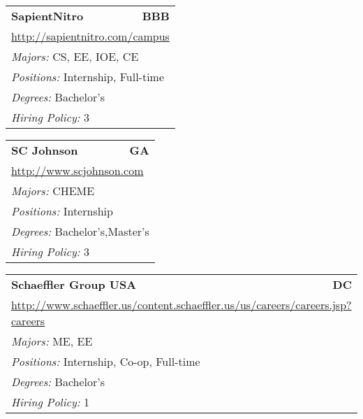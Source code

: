 \documentclass[twoside]{article}
\begin{document}
\begin{center}
\begin{multicols}{3}
\begin{FlushLeft}
\begin{minipage}{.9\columnwidth}
\end{minipage}
 
\begin{minipage}{.9\columnwidth}\begin{tabularx}{.95\columnwidth}{Xr}
                 {\Large\bf SapientNitro} & {\Large\bf BBB}\\
    \multicolumn{2}{p{.95\columnwidth}}{\url{http://sapientnitro.com/campus}}\\
    \multicolumn{2}{p{.95\columnwidth}}{\emph{Majors:} CS, EE, IOE, CE}\\
    \multicolumn{2}{p{.95\columnwidth}}{\emph{Positions:} Internship, Full-time}\\
    \multicolumn{2}{p{.95\columnwidth}}{\emph{Degrees:} Bachelor's}\\
    \multicolumn{2}{p{.95\columnwidth}}{\emph{Hiring Policy:} 3}\\
    \end{tabularx}
    
\end{minipage}
 
\begin{minipage}{.9\columnwidth}\begin{tabularx}{.95\columnwidth}{Xr}
                 {\Large\bf SC Johnson} & {\Large\bf GA}\\
    \multicolumn{2}{p{.95\columnwidth}}{\url{http://www.scjohnson.com}}\\
    \multicolumn{2}{p{.95\columnwidth}}{\emph{Majors:} CHEME}\\
    \multicolumn{2}{p{.95\columnwidth}}{\emph{Positions:} Internship}\\
    \multicolumn{2}{p{.95\columnwidth}}{\emph{Degrees:} Bachelor's,Master's}\\
    \multicolumn{2}{p{.95\columnwidth}}{\emph{Hiring Policy:} 3}\\
    \end{tabularx}
    
\end{minipage}
 
\begin{minipage}{.9\columnwidth}\begin{tabularx}{.95\columnwidth}{Xr}
                 {\Large\bf Schaeffler Group USA} & {\Large\bf DC}\\
    \multicolumn{2}{p{.95\columnwidth}}{\url{http://www.schaeffler.us/content.schaeffler.us/us/careers/careers.jsp?careers}}\\
    \multicolumn{2}{p{.95\columnwidth}}{\emph{Majors:} ME, EE}\\
    \multicolumn{2}{p{.95\columnwidth}}{\emph{Positions:} Internship, Co-op, Full-time}\\
    \multicolumn{2}{p{.95\columnwidth}}{\emph{Degrees:} Bachelor's}\\
    \multicolumn{2}{p{.95\columnwidth}}{\emph{Hiring Policy:} 1}\\
    \end{tabularx}
    

\end{minipage}
\end{FlushLeft}
\end{multicols}
\end{center}
\end{document}
